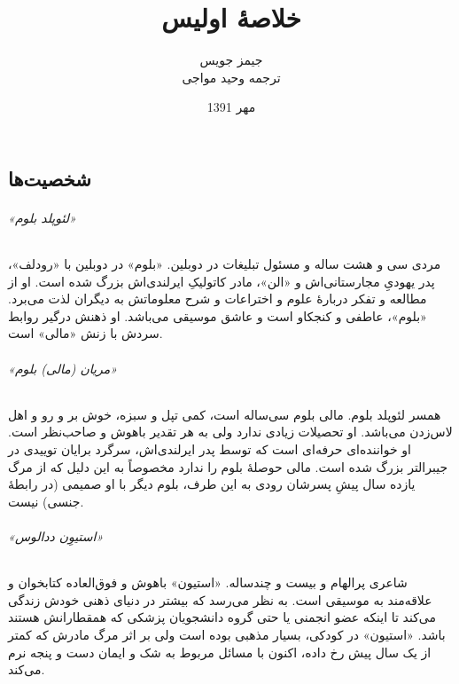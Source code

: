 \documentclass[12pt]{book}
\newcommand{\noun}[1]{«{#1}»}
\begin{document}
    \title{خلاصۀ اولیس }
    \author{جیمز جویس\\
    ترجمه وحید مواجی
    }
    \date{مهر 1391}
    \frontmatter                            %
    \maketitle                              %
    \tableofcontents                        %
    \mainmatter


    \part{}
    \chapter{شخصیت‌ها}
    \paragraph{\noun{لئوپلد بلوم}\protect{}}
    مردی سی و هشت ساله و مسئول تبلیغات در دوبلین. \noun{بلوم} در دوبلین با \noun{رودلف}، پدر یهودیِ مجارستانی‌اش‌ و \noun{الن}، مادر کاتولیکِ ایرلندی‌اش بزرگ شده است. او از مطالعه و تفکر دربارۀ علوم و اختراعات و شرح معلوماتش به دیگران لذت می‌برد. \noun{بلوم}، عاطفی و کنجکاو است و عاشق موسیقی می‌باشد. او ذهنش درگیر روابط سردش با زنش \noun{مالی} است.
    \paragraph{\noun{مریان (مالی) بلوم}\protect{}}
    همسر لئوپلد بلوم. مالی بلوم سی‌ساله است، کمی تپل و سبزه، خوش بر و رو و اهل لاس‌زدن می‌باشد. او تحصیلات زیادی ندارد ولی به هر تقدیر باهوش و صاحب‌نظر است. او خواننده‌ای حرفه‌ای است که توسط پدر ایرلندی‌اش، سرگرد برایان توییدی در جیبرالتر بزرگ شده است. مالی حوصلۀ بلوم را ندارد مخصوصاً به این دلیل که از مرگ یازده سال پیشِ پسرشان رودی به این طرف، بلوم دیگر با او صمیمی (در رابطۀ جنسی) نیست.
    \paragraph{\noun{استیوِن ددالوس}\protect{}}
    شاعری پرالهام و بیست و چندساله. \noun{استیون} باهوش و فوق‌العاده کتابخوان و علاقه‌مند به موسیقی است. به نظر می‌رسد که بیشتر در دنیای ذهنی خودش زندگی می‌کند تا اینکه عضو انجمنی یا حتی گروه دانشجویان پزشکی که همقطارانش هستند باشد. \noun{استیون} در کودکی، بسیار مذهبی بوده است ولی بر اثر مرگ مادرش که کمتر از یک سال پیش رخ داده، اکنون با مسائل مربوط به شک و ایمان دست و پنجه نرم می‌کند.
\end{document}

